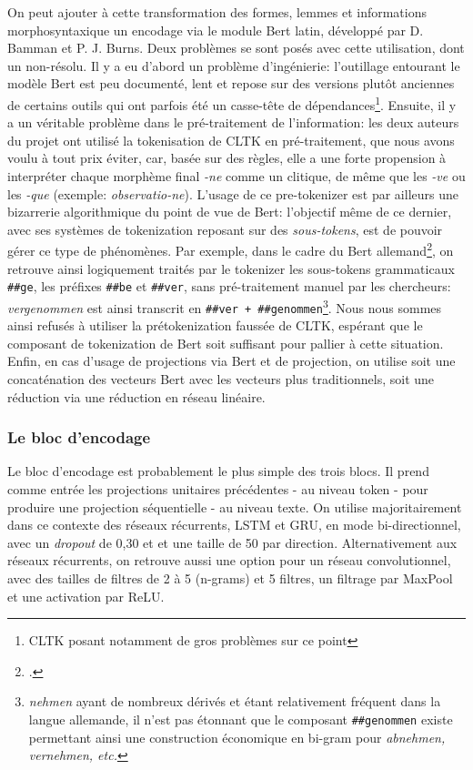 On peut ajouter à cette transformation des formes, lemmes et informations morphosyntaxique un encodage via le module Bert latin, développé par D. Bamman et P. J. Burns. Deux problèmes se sont posés avec cette utilisation, dont un non-résolu. Il y a eu d'abord un problème d'ingénierie: l'outillage entourant le modèle Bert est peu documenté, lent et repose sur des versions plutôt anciennes de certains outils qui ont parfois été un casse-tête de dépendances\footnote{CLTK posant notamment de gros problèmes sur ce point}. Ensuite, il y a un véritable problème dans le pré-traitement de l'information: les deux auteurs du projet ont utilisé la tokenisation de CLTK en pré-traitement, que nous avons voulu à tout prix éviter, car, basée sur des règles, elle a une forte propension à interpréter chaque morphème final \textit{-ne} comme un clitique, de même que les \textit{-ve} ou les \textit{-que} (exemple: \textit{observatio-ne}). L'usage de ce pre-tokenizer est par ailleurs une bizarrerie algorithmique du point de vue de Bert: l'objectif même de ce dernier, avec ses systèmes de tokenization reposant sur des \textit{sous-tokens}, est de pouvoir gérer ce type de phénomènes. Par exemple, dans le cadre du Bert allemand\footcite{chan_german_2019}, on retrouve ainsi logiquement traités par le tokenizer les sous-tokens grammaticaux \texttt{\#\#ge}, les préfixes \texttt{\#\#be} et \texttt{\#\#ver}, sans pré-traitement manuel par les chercheurs: \textit{vergenommen} est ainsi transcrit en \texttt{\#\#ver + \#\#genommen}\footnote{\textit{nehmen} ayant de nombreux dérivés et étant relativement fréquent dans la langue allemande, il n'est pas étonnant que le composant \texttt{\#\#genommen} existe permettant ainsi une construction économique en bi-gram pour \textit{abnehmen, vernehmen, etc.}}. Nous nous sommes ainsi refusés à utiliser la prétokenization faussée de CLTK, espérant que le composant de tokenization de Bert soit suffisant pour pallier à cette situation. Enfin, en cas d'usage de projections via Bert et de projection, on utilise soit une concaténation des vecteurs Bert avec les vecteurs plus traditionnels, soit une réduction via une réduction en réseau linéaire.

\subsubsection{Le bloc d'encodage}

Le bloc d'encodage est probablement le plus simple des trois blocs. Il prend comme entrée les projections unitaires précédentes - au niveau token - pour produire une projection séquentielle - au niveau texte. On utilise majoritairement dans ce contexte des réseaux récurrents, LSTM et GRU, en mode bi-directionnel, avec un \textit{dropout} de 0,30 et et une taille de 50 par direction. Alternativement aux réseaux récurrents, on retrouve aussi une option pour un réseau convolutionnel, avec des tailles de filtres de 2 à 5 (n-grams) et 5 filtres, un filtrage par MaxPool et une activation par ReLU.

